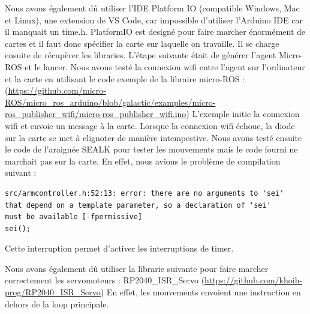 Nous avons également dû utiliser l’IDE Platform IO (compatible Windows, Mac et Linux), une extension de VS Code, 
car impossible d'utiliser l'Arduino IDE car il manquait un time.h.
PlatformIO est designé pour faire marcher énormément de cartes et il faut donc spécifier la carte sur laquelle on travaille. 
Il se charge ensuite de récupèrer les libraries.
L’étape suivante était de générer l’agent Micro-ROS et le lancer.  
Nous avons testé la connexion wifi entre l’agent sur l’ordinateur et la carte en utilisant le code exemple de la libraire micro-ROS : 
(\url{https://github.com/micro-ROS/micro_ros_arduino/blob/galactic/examples/micro-ros_publisher_wifi/micro-ros_publisher_wifi.ino}) 
L’exemple initie la connexion wifi et envoie un message à la carte. Lorsque la connexion wifi échoue, la diode sur la carte se 
met à clignoter de manière intempestive. Nous avons testé ensuite le code de l’araignée SEALK pour tester les mouvements mais le code 
fourni ne marchait pas sur la carte. En effet, nous avions le problème de compilation suivant :  

\begin{lstlisting}
src/armcontroller.h:52:13: error: there are no arguments to 'sei' 
that depend on a template parameter, so a declaration of 'sei' 
must be available [-fpermissive]
sei();
\end{lstlisting}
Cette interruption permet d'activer les interruptions de timer.
\linebreak

Nous avons également dû utiliser la librarie suivante pour faire marcher correctement les servomoteurs : RP2040\_ISR\_Servo (\url{https://github.com/khoih-prog/RP2040_ISR_Servo}) 
En effet, les mouvements envoient une instruction en dehors de la loop principale.



